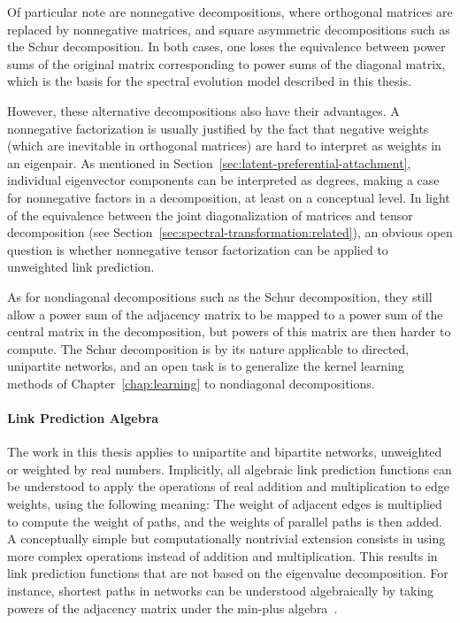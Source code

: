\documentclass[11pt,a4paper]{book}
\begin{document}
Of particular note are nonnegative decompositions, where orthogonal
matrices are replaced by nonnegative matrices, and square asymmetric
decompositions such as the Schur decomposition. 
In both cases, one loses the equivalence between power sums of the
original matrix corresponding to power sums of the diagonal matrix,
which is the basis for the spectral evolution model described in this
thesis. 

However, these alternative decompositions also have their advantages. 
A nonnegative factorization is usually justified by the fact that negative
weights (which are inevitable in orthogonal matrices) are hard to
interpret as weights in an eigenpair.  As mentioned in
Section~\ref{sec:latent-preferential-attachment}, individual eigenvector
components can be interpreted as degrees, making a case for nonnegative
factors in a decomposition, at least on a conceptual level. 
In light of the equivalence between the joint diagonalization of matrices
and tensor decomposition (see
Section~\ref{sec:spectral-transformation:related}), an obvious open 
question is whether nonnegative tensor factorization can be applied to
unweighted link prediction. 

As for nondiagonal decompositions such as the Schur decomposition, they
still allow a power sum of the adjacency matrix to be mapped to a power
sum of the central matrix in the decomposition, but powers of this
matrix are then harder to compute.  The Schur decomposition is by its
nature applicable to directed, unipartite networks, and an open task is to
generalize the kernel learning methods of
Chapter~\ref{chap:learning} to nondiagonal
decompositions.  

\paragraph{Link Prediction Algebra}
The work in this thesis
applies to unipartite and bipartite networks, unweighted or
weighted by real numbers.  Implicitly, all algebraic link prediction
functions can be understood to apply the operations of real addition and
multiplication to edge weights, using the following meaning:  The weight
of adjacent edges is multiplied to compute the weight of paths, and the
weights of parallel paths is then added.  A conceptually simple but
computationally nontrivial extension consists in using more complex
operations instead of addition and multiplication.  
This results in link prediction functions that are not based on the
eigenvalue decomposition.  For instance, shortest paths in networks can
be understood algebraically by taking powers of the adjacency matrix
under the min-plus algebra~\cite{b583}. 
\end{document}
